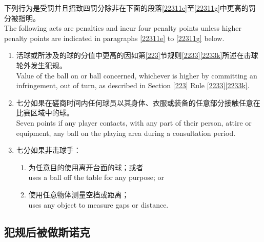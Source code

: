 \noindent 下列行为是受罚并且招致四罚分除非在下面的段落\ref{22311e}至\ref{22311g}中更高的罚分被指明。\\
The following acts are penalties and incur four penalty points unless higher penalty points are indicated in paragraphs \ref{22311e} to \ref{22311g} below.
\begin{enumerate}[label=(\alph*),start=5]
    \item \label{22311e}活球或所涉及的球的分值中更高的因如第\ref{223}节规则\ref{2233}\ref{2233k}所述在击球轮外发生犯规。\\
    Value of the ball on or ball concerned, whichever is higher by committing an infringement, out of turn, as described in Section \ref{223} Rule \ref{2233}\ref{2233k}.
    \item 七分如果在磋商时间内任何球员以其身体、衣服或装备的任意部分接触任意在比赛区域中的球。\\
    Seven points if any player contacts, with any part of their person, attire or equipment, any ball on the playing area during a consultation period.
    \item \label{22311g}七分如果非击球手：
    \begin{enumerate}[label=(\roman*)]
        \item 为任意目的使用离开台面的球；或者\\
        uses a ball off the table for any purpose; or
        \item 使用任意物体测量空档或距离；\\
        uses any object to measure gaps or distance.
    \end{enumerate}
\end{enumerate}

\subsection{犯规后被做斯诺克}\label{22312}

